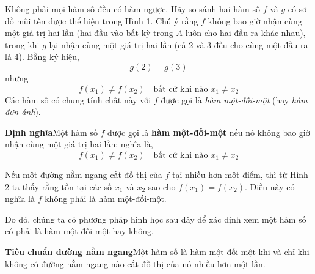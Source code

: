 \begin{minipage}[t]{0.708\textwidth}
    Không phải mọi hàm số đều có hàm ngược. Hãy so sánh hai hàm số $f$ và $g$ có sơ đồ mũi tên được thể hiện trong Hình 1. Chú ý rằng $f$ không bao giờ nhận cùng một giá trị hai lần (hai đầu vào bất kỳ trong $A$ luôn cho hai đầu ra khác nhau), trong khi $g$ lại nhận cùng một giá trị hai lần (cả 2 và 3 đều cho cùng một đầu ra là 4). Bằng ký hiệu,
    \[
    g(2) = g(3)
    \]
    nhưng
    \[
    f(x_1) \neq f(x_2) \quad \text{bất cứ khi nào } x_1 \neq x_2
    \]
    Các hàm số có chung tính chất này với $f$ được gọi là \emph{hàm một-đối-một} (hay \emph{hàm đơn ánh}).

    \vspace{0.5em}
    \begin{definitionbox}
    \textbf{\textsf{\color{stewartred}\; Định nghĩa}}\quad Một hàm số $f$ được gọi là \textbf{hàm một-đối-một} nếu nó không bao giờ nhận cùng một giá trị hai lần; nghĩa là,
    \[
    f(x_1) \neq f(x_2) \quad \text{bất cứ khi nào } x_1 \neq x_2
    \]
    \end{definitionbox}
    \vspace{0.5em}

    Nếu một đường nằm ngang cắt đồ thị của $f$ tại nhiều hơn một điểm, thì từ Hình 2 ta thấy rằng tồn tại các số $x_1$ và $x_2$ sao cho $f(x_1) = f(x_2)$. Điều này có nghĩa là $f$ không phải là hàm một-đối-một.

    Do đó, chúng ta có phương pháp hình học sau đây để xác định xem một hàm số có phải là hàm một-đối-một hay không.

    \vspace{0.5em}
    \begin{definitionbox}
    \textbf{\textsf{\color{stewartred}Tiêu chuẩn đường nằm ngang}}\quad Một hàm số là hàm một-đối-một khi và chỉ khi không có đường nằm ngang nào cắt đồ thị của nó nhiều hơn một lần.
    \end{definitionbox}
\end{minipage}